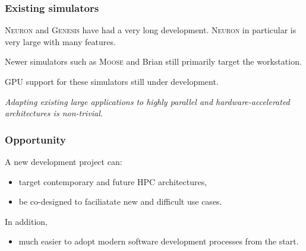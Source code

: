 \documentclass[aspectratio=43,12pt]{beamer}
\begin{document}
\begin{frame}
\frametitle{Existing simulators}

\textsc{Neuron} and \textsc{Genesis} have had a very long development.
\textsc{Neuron} in particular is very large with many features.

\vspace{2ex}
Newer simulators such as \textsc{Moose} and Brian still primarily
target the workstation.

\vspace{2ex}
GPU support for these simulators still under development.

\vspace{2ex}
\emph{Adapting existing large applications to highly parallel
and hardware-accelerated architectures is non-trivial.}

\end{frame}

\begin{frame}
\frametitle{Opportunity}
A new development project can:
\vfill
\begin{itemize}
\item target contemporary and future HPC architectures,
\item be co-designed to faciliatate new and difficult use cases.
\end{itemize}

\vfill
\pause
In addition,
\begin{itemize}
\item much easier to adopt modern software development processes from the start.
\end{itemize}
\vfill
\end{frame}
\end{document}
